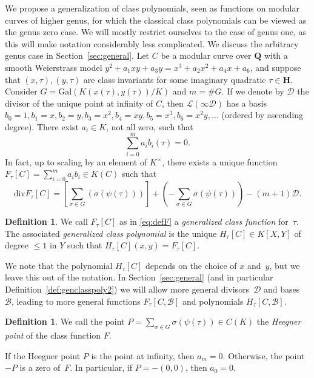 \documentclass{amsart}
\newcommand{\QQ}{\mathbf{Q}}
\newcommand{\HH}{\mathbf{H}}
\renewcommand{\div}{\mathrm{div}}
\newcommand{\Gal}{\mathrm{Gal}}
\newcommand{\mc}{\mathcal}
\numberwithin{equation}{section}
\theoremstyle{definition}
\newtheorem{definition}[equation]{Definition}
\begin{document}
We propose a generalization of class polynomials, seen as functions on modular curves of higher genus, for which the classical class polynomials can be viewed as the genus zero case. We will mostly restrict ourselves to the case of genus one, as this will make notation considerably less complicated. We discuss the arbitrary genus case in Section~\ref{sec:general}.
Let $C$ be a modular curve over $\QQ$ with a smooth Weierstrass model
$y^2+a_1xy+a_3y=x^3+a_2x^2+a_4x+a_6$, and suppose that $(x,\tau),(y,\tau)$ are class invariants for some imaginary quadratic $\tau\in\HH$.
Consider $G = \Gal(K(x(\tau),y(\tau))/K)$ and $m=\#G$.
If we denote by $\mc{D}$ the divisor of the unique point at infinity of $C$, then $\mc{L}(\infty \mc{D})$ has a basis $b_0=1,b_1=x,b_2=y,b_3=x^2,b_4=xy,b_5=x^3,b_6=x^2y,\ldots$ (ordered by ascending degree).
There exist $a_i\in K$, not all zero, such that
\begin{equation}\label{eq:lineareqn}
\sum_{i=0}^m a_i b_i(\tau)=0.
\end{equation}
In fact, up to scaling by an element of $K^{\times}$, there exists a unique function $F_{\tau}[C]=\sum_{i=0}^m a_ib_i\in K(C)$ such that
\begin{equation}\label{eq:defF}
\div F_{\tau}[C] = \left[\sum_{\sigma\in G} \left(\sigma(\psi(\tau))\right)\right]+\left(-\sum_{\sigma\in G}\sigma(\psi(\tau))\right)-(m+1)\mc{D}.
\end{equation}
\begin{definition}\label{def:genclasspoly1}
We call $F_{\tau}[C]$ as in \eqref{eq:defF}
a \emph{generalized class function} for~$\tau$.
The associated \emph{generalized class polynomial}
is the unique $H_{\tau}[C]\in K[X,Y]$ of degree $\leq 1$ in $Y$
such that $H_{\tau}[C](x,y) = F_{\tau}[C]$.
\end{definition}
We note that the
polynomial
$H_{\tau}[C]$ depends
on the choice of $x$ and~$y$, but we leave this out of the notation.
In Section~\ref{sec:general} (and
in particular Definition~\ref{def:genclasspoly2})
we will allow more general
divisors~$\mc{D}$
and bases~$\mc{B}$,
leading to more general
functions $F_{\tau}[C,\mc{B}]$ and polynomials
$H_{\tau}[C,\mc{B}]$.

\begin{definition}
We call the point
$P = \sum_{\sigma \in G}\sigma(\psi(\tau))\in C(K)$
the \emph{Heegner point} of the class function $F$.
\end{definition}
If the Heegner point $P$ is the point at infinity, then $a_m=0$.
Otherwise, the point $-P$ is a zero of~$F$.
In particular, if $P=-(0,0)$, then $a_0=0$.
\end{document}
